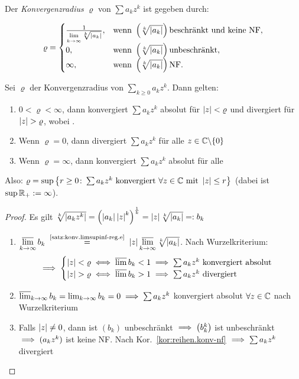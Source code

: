 \documentclass[12pt]{scrreprt}
\begin{document}
\begin{dfn}\label{dfn:reihen.konvradius}
Der \emph{Konvergenzradius} $\varrho$ von $\sum a_kz^k$ ist gegeben durch:

\[\varrho = 
\begin{cases}
	\frac{1}{\lim\limits_{k\rightarrow\infty}\sqrt[k]{\left\lvert a_k\right\lvert}},	& \text{wenn } \left(\sqrt[k]{\left\lvert a_k\right\lvert}\right) \text{beschränkt und keine NF},\\
	0,											& \text{wenn } \left(\sqrt[k]{\left\lvert a_k\right\lvert}\right) \text{unbeschränkt},\\
	\infty,										& \text{wenn } \left(\sqrt[k]{\left\lvert a_k\right\lvert}\right) \text{NF}.
\end{cases}\]
\end{dfn}

\begin{thm}\label{thm:reihen.konvradius}
Sei $\varrho$ der Konvergenzradius von $\sum_{k \ge 0} a_kz^k$. Dann gelten:
\begin{enumerate}
\item $0 < \varrho < \infty$, dann konvergiert $\sum a_kz^k$ absolut für $\left\lvert z\right\lvert < \varrho$
und divergiert für $\left\lvert z\right\lvert > \varrho$, wobei .\label{thm:reihen.konvradius.a}
\item Wenn $\varrho = 0$, dann divergiert $\sum a_kz^k$ für alle $z\in\mathbb{C}\backslash\{0\}$\label{thm:reihen.konvradius.b}
\item Wenn $\varrho = \infty$, dann konvergiert $\sum a_kz^k$ absolut für alle \label{thm:reihen.konvradius.c}
\end{enumerate}
Also: $\varrho = \sup \left\{r \ge 0\colon \sum a_kz^k\text{ konvergiert }\forall z\in\mathbb{C}\text{ mit }\left\lvert z\right\lvert \le r\right\}$ 
(dabei ist $\sup \mathbb{R}_+ := \infty$).
\end{thm}
\begin{proof}
Es gilt $\sqrt[k]{\left\lvert a_kz^k\right\lvert} = \left(\left\lvert a_k\right\lvert\left\lvert z\right\lvert^k\right)^{\frac{1}{k}} = \left\lvert z\right\lvert\sqrt[k]{\left\lvert a_k\right\lvert} =: b_k$
\begin{enumerate}
\item $\ls\limits_{\kinf} b_k \nach{=}{\ref{satz:konv.limsupinf-reg.e}} \abs{z}\ls\limits_{\kinf}\sqrt[k]{\abs{a_k}}$.
Nach Wurzelkriterium: \[\implies \begin{cases}
	\left\lvert z\right\lvert < \varrho \iff \varlimsup b_k < 1 \implies \sum a_kz^k\text{ konvergiert absolut}\\
	\left\lvert z\right\lvert > \varrho \iff \varlimsup b_k > 1 \implies \sum a_kz^k\text{ divergiert}
\end{cases}\]
\setcounter{enumi}{2}
\item $\varlimsup_{k\rightarrow\infty} b_k = \lim_{k\rightarrow\infty} b_k = 0 \implies \sum a_kz^k$ konvergiert absolut 
$\forall z\in\mathbb{C}$ nach Wurzelkriterium
\setcounter{enumi}{1}
\item Falls $\left\lvert z\right\lvert \neq 0$, dann ist $(b_k)$ unbeschränkt $\implies \left(b_k^k\right)$ ist unbeschränkt
$\implies (a_kz^k)$ ist keine NF. Nach Kor.~\ref{kor:reihen.konv-nf} $\implies \sum a_kz^k$ divergiert
\end{enumerate}
\end{proof}
\end{document}
